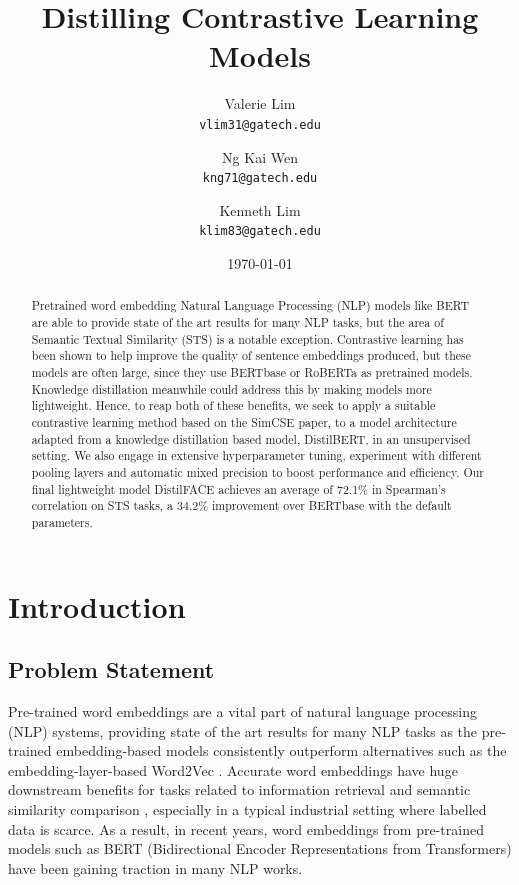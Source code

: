 \documentclass[10pt,twocolumn,letterpaper]{article}
\title{Distilling Contrastive Learning Models}
\author{
Valerie Lim \\ {\tt\small vlim31@gatech.edu}
\and
Ng Kai Wen \\ {\tt\small kng71@gatech.edu}
\and
Kenneth Lim \\ {\tt\small klim83@gatech.edu}
\date{\today}
}
\begin{document}
\maketitle

\begin{abstract}
    Pretrained word embedding Natural Language Processing (NLP) models like BERT are able to provide state of the art results for many NLP tasks, but the area of Semantic Textual Similarity (STS) is a notable exception. Contrastive learning has been shown to help improve the quality of sentence embeddings produced, but these models are often large, since they use BERTbase or RoBERTa as pretrained models. Knowledge distillation meanwhile could address this by making models more lightweight. Hence, to reap both of these benefits, we seek to apply a suitable contrastive learning method based on the SimCSE paper, to a model architecture adapted from a knowledge distillation based model, DistilBERT, in an unsupervised setting. We also engage in extensive hyperparameter tuning, experiment with different pooling layers and automatic mixed precision to boost performance and efficiency. Our final lightweight model DistilFACE achieves an average of 72.1\% in Spearman’s correlation on STS tasks, a 34.2\% improvement over BERTbase with the default parameters.
\end{abstract}


\section{Introduction}

\subsection{Problem Statement}

Pre-trained word embeddings are a vital part of natural language processing (NLP) systems, providing state of the art results for many NLP tasks  as the pre-trained embedding-based models consistently outperform alternatives such as the embedding-layer-based Word2Vec \cite{farahmand}. Accurate word embeddings have huge downstream benefits for tasks related to information retrieval and semantic similarity comparison \cite{2105.11741}, especially in a typical industrial setting where labelled data is scarce. As a result, in recent years, word embeddings from pre-trained models such as BERT (Bidirectional Encoder Representations from Transformers) have been gaining traction in many NLP works.
\end{document}
